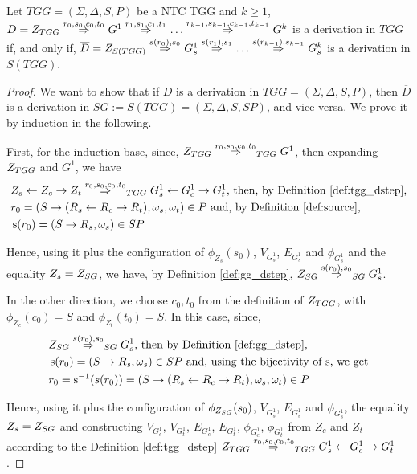 \documentclass[runningheads]{llncs}
\begin{document}
\begin{theorem}
	\label{thm:one_d_enough}
	Let $TGG = (\Sigma, \Delta, S, P)$ be a NTC TGG and $k \ge 1$, \\
	$D = \startTG{TGG} \tderiv{r_0}{s_0,c_0,t_0}{} G^1 \tderiv{r_1}{s_1,c_1,t_1}{} \dots \tderiv{r_{k-1}}{s_{k-1},c_{k-1},t_{k-1}}{} G^k$ is a derivation in $TGG$ if, and only if, $\overline{D} = \startG{S(TGG)} \deriv{s(r_0)}{s_0}{} G^1_s \deriv{s(r_1)}{s_1}{} \dots \deriv{s(r_{k-1})}{s_{k-1}}{} G^k_s$ is a derivation in $S(TGG)$.
\end{theorem}
\begin{proof}
	We want to show that if $D$ is a derivation in $TGG = (\Sigma, \Delta, S, P)$, then $\overline{D}$ is a derivation in $SG := S(TGG) = (\Sigma, \Delta, S, SP)$, and vice-versa. We prove it by induction in the following.
	
	First, for the induction base, since, $\startTG{TGG} \tderiv{r_0}{s_0,c_0,t_0}{TGG} G^1$, then expanding $Z_{TGG}$ and $G^1$, we have
	\begin{align*}
		& Z_s \ms{} Z_c \mt{} Z_t \tderiv{r_0}{s_0,c_0,t_0}{TGG} G^1_s \ms{} G^1_c \mt{} G^1_t \text{, then, by Definition \ref{def:tgg_dstep},}\\
		& r_0 = (S \pro (R_s \ms{} R_c \mt{} R_t), \omega_s, \omega_t) \in P \text{ and, by Definition \ref{def:source},}\\
		& \source(r_0) = (S \pro R_s, \omega_s) \in SP
	\end{align*}
	
	Hence, using it plus the configuration of $\phi_{Z_s}(s_0)$, $V_{G^1_s}$, $E_{G^1_s}$ and $\phi_{G^1_s}$ and the equality $Z_s = Z_{SG}$, we have, by Definition \ref{def:gg_dstep}, $\startG{SG} \deriv{\source(r_0)}{s_0}{SG} G^1_s$.
	
	In the other direction, we choose $c_0, t_0$ from the definition of $Z_{TGG}$, with $\phi_{Z_c}(c_0) = S$ and  $\phi_{Z_t}(t_0) = S$. In this case, since,
	\begin{align*}
		& \startG{SG} \deriv{s(r_0)}{s_0}{SG} G^1_s \text{, then by Definition \ref{def:gg_dstep},}\\
		& \source(r_0) = (S \pro R_s, \omega_s) \in SP \text{ and, using the bijectivity of $\source$, we get}\\
		& r_0 = \source^{-1}(s(r_0)) = (S \pro (R_s \ms{} R_c \mt{} R_t), \omega_s, \omega_t) \in P
	\end{align*}
	
	Hence, using it plus the configuration of $\phi_{Z_{SG}}(s_0)$, $V_{G^1_s}$, $E_{G^1_s}$ and $\phi_{G^1_s}$, the equality $Z_s = Z_{SG}$ and constructing $V_{G^1_c}$, $V_{G^1_t}$, $E_{G^1_c}$, $E_{G^1_t}$, $\phi_{G^1_c}$, $\phi_{G^1_t}$ from $Z_c$ and $Z_t$ according to the Definition \ref{def:tgg_dstep} $\startTG{TGG} \tderiv{r_0}{s_0,c_0,t_0}{TGG} G^1_s \ms{} G^1_c \mt{} G^1_t$.
	

\end{proof}
\end{document}
